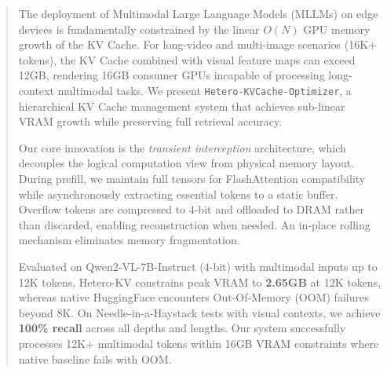 \begin{abstract}
The deployment of Multimodal Large Language Models (MLLMs) on edge devices is fundamentally constrained by the linear $O(N)$ GPU memory growth of the KV Cache. For long-video and multi-image scenarios (16K+ tokens), the KV Cache combined with visual feature maps can exceed 12GB, rendering 16GB consumer GPUs incapable of processing long-context multimodal tasks. We present \texttt{Hetero-KVCache-Optimizer}, a hierarchical KV Cache management system that achieves sub-linear VRAM growth while preserving full retrieval accuracy.

Our core innovation is the \textit{transient interception} architecture, which decouples the logical computation view from physical memory layout. During prefill, we maintain full tensors for FlashAttention compatibility while asynchronously extracting essential tokens to a static buffer. Overflow tokens are compressed to 4-bit and offloaded to DRAM rather than discarded, enabling reconstruction when needed. An in-place rolling mechanism eliminates memory fragmentation.

Evaluated on Qwen2-VL-7B-Instruct (4-bit) with multimodal inputs up to 12K tokens, Hetero-KV constrains peak VRAM to \textbf{2.65GB} at 12K tokens, whereas native HuggingFace encounters Out-Of-Memory (OOM) failures beyond 8K. On Needle-in-a-Haystack tests with visual contexts, we achieve \textbf{100\% recall} across all depths and lengths. Our system successfully processes 12K+ multimodal tokens within 16GB VRAM constraints where native baseline fails with OOM.
\end{abstract}
